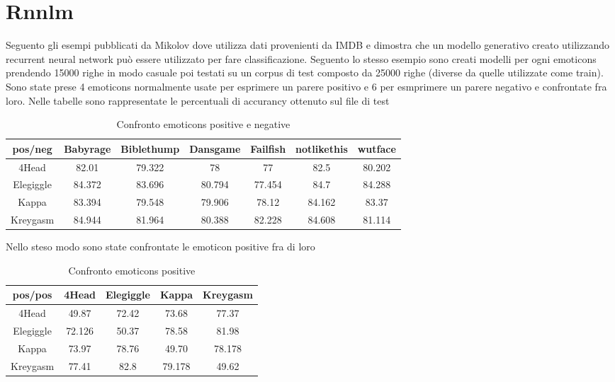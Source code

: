 \documentclass[a4paper,12pt,openright,twoside]{report}
\theoremstyle{definition}
\begin{document}
\chapter{Rnnlm}
\label{ch:rnnlm}
Seguento gli esempi pubblicati da Mikolov dove utilizza dati provenienti da IMDB e dimostra che un  modello generativo creato utilizzando recurrent neural network  può essere utilizzato per fare classificazione. Seguento lo stesso esempio sono creati modelli per ogni emoticons prendendo 15000 righe in modo casuale poi testati su un corpus di test composto da 25000 righe (diverse da quelle utilizzate come train).
Sono state prese 4 emoticons normalmente usate per esprimere un parere positivo e 6 per esmprimere un parere negativo e confrontate fra loro. Nelle tabelle sono rappresentate le percentuali di accurancy ottenuto sul file di test
\begin{table}[h]
\begin{center}
\begin{tabular}{|c|c|c|c|c|c|c|}
\hline
pos/neg & Babyrage & Biblethump & Dansgame & Failfish & notlikethis & wutface \\
\hline
\hline
4Head & 82.01 &  79.322 & 78 & 77 & 82.5 & 80.202 \\
\hline
Elegiggle & 84.372 & 83.696 & 80.794 & 77.454 & 84.7 & 84.288 \\
\hline
Kappa & 83.394 & 79.548 & 79.906 & 78.12 & 84.162 & 83.37 \\
\hline
Kreygasm & 84.944 & 81.964 & 80.388 & 82.228 & 84.608 & 81.114 \\
\hline
\end{tabular}
\end{center}
\caption{Confronto emoticons positive e negative}
\label{tab:rnnlmTest1}
\end{table}

Nello steso modo sono state confrontate le emoticon positive fra di loro
\begin{table}[h]
\begin{center}
\begin{tabular}{|c|c|c|c|c|}
\hline
pos/pos & 4Head & Elegiggle & Kappa & Kreygasm \\
\hline
\hline
4Head & 49.87 &  72.42 & 73.68 & 77.37 \\
\hline
Elegiggle & 72.126 & 50.37 & 78.58 & 81.98 \\
\hline
Kappa & 73.97 & 78.76 & 49.70 & 78.178 \\
\hline
Kreygasm & 77.41 & 82.8 & 79.178 & 49.62 \\
\hline
\end{tabular}
\end{center}
\caption{Confronto emoticons positive}
\label{tab:rnnlmTest2 }
\end{table}
\end{document}
